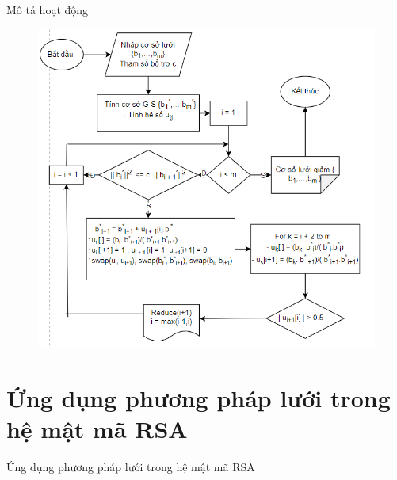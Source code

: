 \documentclass{beamer}
\numberwithin{equation}{section}
\begin{document}
\begin{frame}{Mô tả   hoạt động}
 
 


\begin{figure}[h]
\centering
\includegraphics[scale = 0.6]{pictures/a.11.3.png}
\end{figure}
    
\end{frame}
\section{Ứng dụng phương pháp lưới trong hệ mật mã RSA}
\begin{frame}{Ứng dụng phương pháp lưới trong hệ mật mã RSA}

\end{frame}
\end{document}
